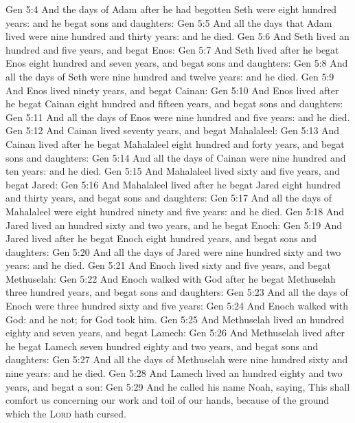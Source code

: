 \vs Gen 5:4 And the days of Adam after he had begotten Seth were eight hundred years: and he begat sons and daughters:
\vs Gen 5:5 And all the days that Adam lived were nine hundred and thirty years: and he died.
\vs Gen 5:6 And Seth lived an hundred and five years, and begat Enos:
\vs Gen 5:7 And Seth lived after he begat Enos eight hundred and seven years, and begat sons and daughters:
\vs Gen 5:8 And all the days of Seth were nine hundred and twelve years: and he died.
\vs Gen 5:9 And Enos lived ninety years, and begat Cainan:
\vs Gen 5:10 And Enos lived after he begat Cainan eight hundred and fifteen years, and begat sons and daughters:
\vs Gen 5:11 And all the days of Enos were nine hundred and five years: and he died.
\vs Gen 5:12 And Cainan lived seventy years, and begat Mahalaleel:
\vs Gen 5:13 And Cainan lived after he begat Mahalaleel eight hundred and forty years, and begat sons and daughters:
\vs Gen 5:14 And all the days of Cainan were nine hundred and ten years: and he died.
\vs Gen 5:15 And Mahalaleel lived sixty and five years, and begat Jared:
\vs Gen 5:16 And Mahalaleel lived after he begat Jared eight hundred and thirty years, and begat sons and daughters:
\vs Gen 5:17 And all the days of Mahalaleel were eight hundred ninety and five years: and he died.
\vs Gen 5:18 And Jared lived an hundred sixty and two years, and he begat Enoch:
\vs Gen 5:19 And Jared lived after he begat Enoch eight hundred years, and begat sons and daughters:
\vs Gen 5:20 And all the days of Jared were nine hundred sixty and two years: and he died.
\vs Gen 5:21 And Enoch lived sixty and five years, and begat Methuselah:
\vs Gen 5:22 And Enoch walked with God after he begat Methuselah three hundred years, and begat sons and daughters:
\vs Gen 5:23 And all the days of Enoch were three hundred sixty and five years:
\vs Gen 5:24 And Enoch walked with God: and he  not; for God took him.
\vs Gen 5:25 And Methuselah lived an hundred eighty and seven years, and begat Lamech:
\vs Gen 5:26 And Methuselah lived after he begat Lamech seven hundred eighty and two years, and begat sons and daughters:
\vs Gen 5:27 And all the days of Methuselah were nine hundred sixty and nine years: and he died.
\vs Gen 5:28 And Lamech lived an hundred eighty and two years, and begat a son:
\vs Gen 5:29 And he called his name Noah, saying, This  shall comfort us concerning our work and toil of our hands, because of the ground which the \textsc{Lord} hath cursed.
